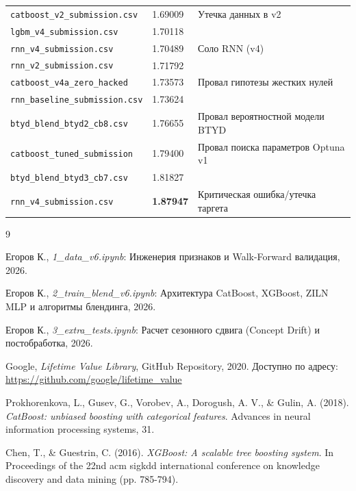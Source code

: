 \documentclass[12pt, a4paper]{article}
\newcommand{\rmsleBad}[1]{\textbf{\color{danger}#1}}
\begin{document}
\begin{table}[H]
\begin{tabular}{l l p{7cm}}
			\texttt{catboost\_v2\_submission.csv} & 1.69009 & Утечка данных в v2 \\
			\texttt{lgbm\_v4\_submission.csv} & 1.70118 & \\
			\texttt{rnn\_v4\_submission.csv} & 1.70489 & Соло RNN (v4) \\
			\texttt{rnn\_v2\_submission.csv} & 1.71792 & \\
			\texttt{catboost\_v4a\_zero\_hacked} & 1.73573 & Провал гипотезы жестких нулей \\
			\texttt{rnn\_baseline\_submission.csv} & 1.73624 & \\
			\texttt{btyd\_blend\_btyd2\_cb8.csv} & 1.76655 & Провал вероятностной модели BTYD \\
			\texttt{catboost\_tuned\_submission} & 1.79400 & Провал поиска параметров Optuna v1 \\
			\texttt{btyd\_blend\_btyd3\_cb7.csv} & 1.81827 & \\
			\texttt{rnn\_v4\_submission.csv} & \rmsleBad{1.87947} & Критическая ошибка/утечка таргета \\
			\bottomrule
		\end{tabular}
	\end{table}
	
	\clearpage
	\begin{thebibliography}{9}
		
		Егоров К., \textit{1\_data\_v6.ipynb}: Инженерия признаков и Walk-Forward валидация, 2026.
		
		Егоров К., \textit{2\_train\_blend\_v6.ipynb}: Архитектура CatBoost, XGBoost, ZILN MLP и алгоритмы блендинга, 2026.
		
		Егоров К., \textit{3\_extra\_tests.ipynb}: Расчет сезонного сдвига (Concept Drift) и постобработка, 2026.
		
		Google, \textit{Lifetime Value Library}, GitHub Repository, 2020. Доступно по адресу: \url{https://github.com/google/lifetime_value}
		
		Prokhorenkova, L., Gusev, G., Vorobev, A., Dorogush, A. V., \& Gulin, A. (2018). \textit{CatBoost: unbiased boosting with categorical features}. Advances in neural information processing systems, 31.
		
		Chen, T., \& Guestrin, C. (2016). \textit{XGBoost: A scalable tree boosting system}. In Proceedings of the 22nd acm sigkdd international conference on knowledge discovery and data mining (pp. 785-794).
		
	\end{thebibliography}
	
\end{document}
